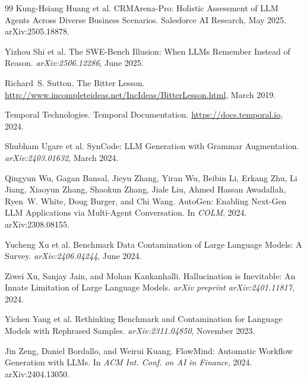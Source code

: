 \documentclass[11pt]{article}
\begin{document}
\begin{thebibliography}{99}
Kung-Hsiang Huang et al.
\newblock CRMArena-Pro: Holistic Assessment of LLM Agents Across Diverse Business Scenarios.
\newblock Salesforce AI Research, May 2025.
\newblock arXiv:2505.18878.

Yizhou Shi et al.
\newblock The SWE-Bench Illusion: When LLMs Remember Instead of Reason.
\newblock \emph{arXiv:2506.12286}, June 2025.

Richard~S. Sutton.
\newblock The Bitter Lesson.
\newblock \url{http://www.incompleteideas.net/IncIdeas/BitterLesson.html}, March 2019.

Temporal Technologies.
\newblock Temporal Documentation.
\newblock \url{https://docs.temporal.io}, 2024.

Shubham Ugare et al.
\newblock SynCode: LLM Generation with Grammar Augmentation.
\newblock \emph{arXiv:2403.01632}, March 2024.

Qingyun Wu, Gagan Bansal, Jieyu Zhang, Yiran Wu, Beibin Li, Erkang Zhu, Li Jiang, Xiaoyun Zhang, Shaokun Zhang, Jiale Liu, Ahmed Hassan Awadallah, Ryen~W. White, Doug Burger, and Chi Wang.
\newblock AutoGen: Enabling Next-Gen LLM Applications via Multi-Agent Conversation.
\newblock In \emph{COLM}, 2024.
\newblock arXiv:2308.08155.

Yucheng Xu et al.
\newblock Benchmark Data Contamination of Large Language Models: A Survey.
\newblock \emph{arXiv:2406.04244}, June 2024.

Ziwei Xu, Sanjay Jain, and Mohan Kankanhalli.
\newblock Hallucination is Inevitable: An Innate Limitation of Large Language Models.
\newblock \emph{arXiv preprint arXiv:2401.11817}, 2024.

Yichen Yang et al.
\newblock Rethinking Benchmark and Contamination for Language Models with Rephrased Samples.
\newblock \emph{arXiv:2311.04850}, November 2023.

Jin Zeng, Daniel Bordallo, and Weirui Kuang.
\newblock FlowMind: Automatic Workflow Generation with LLMs.
\newblock In \emph{ACM Int. Conf. on AI in Finance}, 2024.
\newblock arXiv:2404.13050.


\end{thebibliography}
\end{document}
